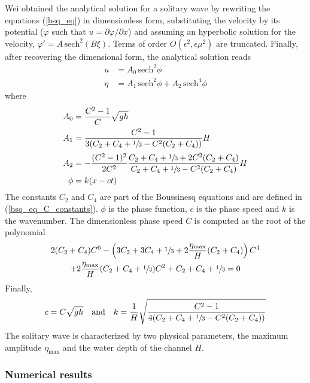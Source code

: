Wei obtained the analytical solution for a solitary wave by rewriting the equations (\ref{bsq_eq}) in dimensionless form, substituting the velocity by its potential ($\varphi$ such that $u = \partial \varphi / \partial x$) and assuming an hyperbolic solution for the velocity, $\varphi' = A\,\text{sech}^2(B\xi)$. Terms of order $O(\epsilon^2, \epsilon\mu^2)$ are truncated. Finally, after recovering the dimensional form, the analytical solution reads
\begin{align}
    u    &= A_0 \, \text{sech}^2 \phi \\
    \eta &= A_1 \, \text{sech}^2 \phi + A_2 \, \text{sech}^4 \phi
\end{align}
where
\begin{equation}
\begin{split}
    A_0 &= \frac{C^2-1}{C}\sqrt{gh} \\
    A_1 &= \frac{C^2-1}{3(C_2 + C_4 + \sfrac{1}{3} - C^2 (C_2 + C_4))} H \\[2pt]
    A_2 &= -\frac{(C^2-1)^2}{2C^2}\frac{C_2 + C_4 + \sfrac{1}{3} + 2C^2(C_2 + C_4)}{C_2 + C_4 + \sfrac{1}{3} - C^2(C_2 + C_4)} H \\
    \phi &= k (x - ct)
\end{split}
\end{equation}
The constants $C_2$ and $C_4$ are part of the Boussinesq equations and are defined in (\ref{bsq_eq_C_constants}). $\phi$ is the phase function, $c$ is the phase speed and $k$ is the wavenumber. The dimensionless phase speed $C$ is computed as the root of the polynomial
\begin{multline*}
    2(C_2 + C_4) C^6
    -\left(3C_2 + 3C_4 + \sfrac{1}{3} + 2\frac{\eta_{\text{max}}}{H}(C_2 + C_4)\right) C^4 \\
    +2\frac{\eta_{\text{max}}}{H} (C_2 + C_4 + \sfrac{1}{3}) C^2
    +C_2 + C_4 + \sfrac{1}{3} = 0
\end{multline*}
Finally,
\begin{equation*}
    c = C\sqrt{gh} \quad \text{and} \quad
    k = \frac{1}{H}\sqrt{\frac{C^2 - 1}{4(C_2 + C_4 + \sfrac{1}{3} - C^2(C_2 + C_4))}}
\end{equation*}
The solitary wave is characterized by two physical parameters, the maximum amplitude $\eta_\text{max}$ and the water depth of the channel $H$.


\subsubsection{Numerical results}


